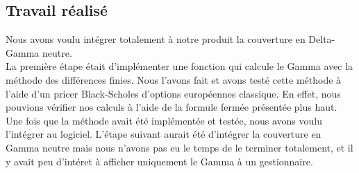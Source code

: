 \documentclass[french,12pt,a4paper]{article}
\begin{document}
\subsection{Travail réalisé}
Nous avons voulu intégrer totalement à notre produit la  couverture en Delta-Gamma neutre. \\
\indent La première étape était d'implémenter une fonction qui calcule le Gamma avec la méthode des différences finies. Nous l'avons fait et avons testé cette méthode à l'aide d'un pricer Black-Scholes d'options européennes classique. En effet, nous pouvions vérifier nos calculs à l'aide de la formule fermée présentée plus haut. \\
\indent Une fois que la méthode avait été implémentée et testée, nous avons voulu l'intégrer au logiciel. L'étape suivant aurait été d'intégrer la couverture en Gamma neutre mais nous n'avons pas eu le temps de le terminer totalement, et il y avait peu d'intéret à afficher uniquement le Gamma à un gestionnaire.
\end{document}
